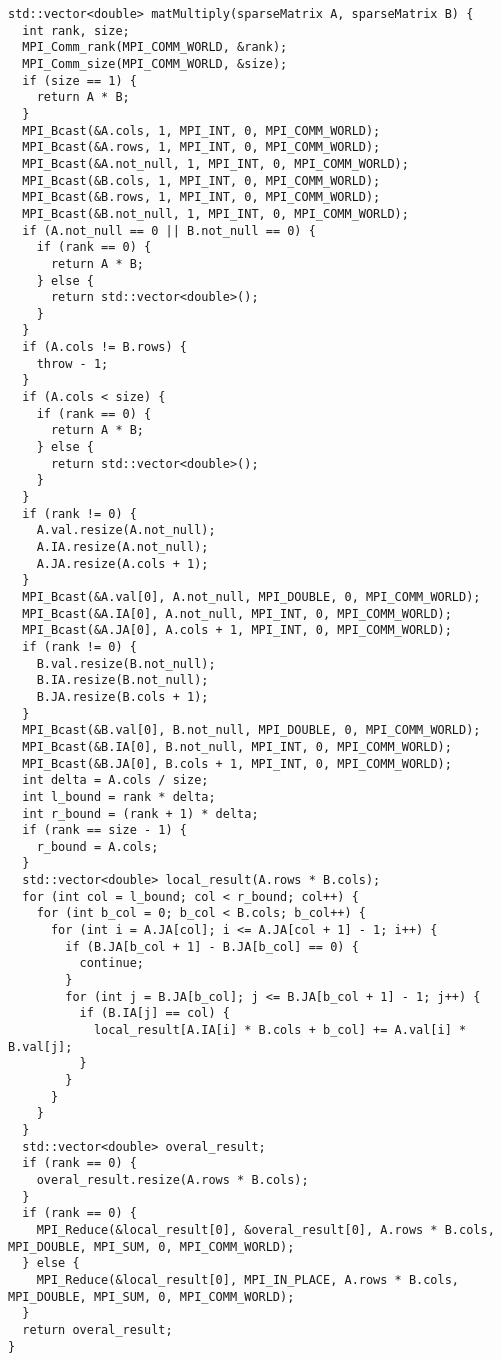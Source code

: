 \documentclass{report}
\begin{document}
\begin{lstlisting}
std::vector<double> matMultiply(sparseMatrix A, sparseMatrix B) {
  int rank, size;
  MPI_Comm_rank(MPI_COMM_WORLD, &rank);
  MPI_Comm_size(MPI_COMM_WORLD, &size);
  if (size == 1) {
    return A * B;
  }
  MPI_Bcast(&A.cols, 1, MPI_INT, 0, MPI_COMM_WORLD);
  MPI_Bcast(&A.rows, 1, MPI_INT, 0, MPI_COMM_WORLD);
  MPI_Bcast(&A.not_null, 1, MPI_INT, 0, MPI_COMM_WORLD);
  MPI_Bcast(&B.cols, 1, MPI_INT, 0, MPI_COMM_WORLD);
  MPI_Bcast(&B.rows, 1, MPI_INT, 0, MPI_COMM_WORLD);
  MPI_Bcast(&B.not_null, 1, MPI_INT, 0, MPI_COMM_WORLD);
  if (A.not_null == 0 || B.not_null == 0) {
    if (rank == 0) {
      return A * B;
    } else {
      return std::vector<double>();
    }
  }
  if (A.cols != B.rows) {
    throw - 1;
  }
  if (A.cols < size) {
    if (rank == 0) {
      return A * B;
    } else {
      return std::vector<double>();
    }
  }
  if (rank != 0) {
    A.val.resize(A.not_null);
    A.IA.resize(A.not_null);
    A.JA.resize(A.cols + 1);
  }
  MPI_Bcast(&A.val[0], A.not_null, MPI_DOUBLE, 0, MPI_COMM_WORLD);
  MPI_Bcast(&A.IA[0], A.not_null, MPI_INT, 0, MPI_COMM_WORLD);
  MPI_Bcast(&A.JA[0], A.cols + 1, MPI_INT, 0, MPI_COMM_WORLD);
  if (rank != 0) {
    B.val.resize(B.not_null);
    B.IA.resize(B.not_null);
    B.JA.resize(B.cols + 1);
  }
  MPI_Bcast(&B.val[0], B.not_null, MPI_DOUBLE, 0, MPI_COMM_WORLD);
  MPI_Bcast(&B.IA[0], B.not_null, MPI_INT, 0, MPI_COMM_WORLD);
  MPI_Bcast(&B.JA[0], B.cols + 1, MPI_INT, 0, MPI_COMM_WORLD);
  int delta = A.cols / size;
  int l_bound = rank * delta;
  int r_bound = (rank + 1) * delta;
  if (rank == size - 1) {
    r_bound = A.cols;
  }
  std::vector<double> local_result(A.rows * B.cols);
  for (int col = l_bound; col < r_bound; col++) {
    for (int b_col = 0; b_col < B.cols; b_col++) {
      for (int i = A.JA[col]; i <= A.JA[col + 1] - 1; i++) {
        if (B.JA[b_col + 1] - B.JA[b_col] == 0) {
          continue;
        }
        for (int j = B.JA[b_col]; j <= B.JA[b_col + 1] - 1; j++) {
          if (B.IA[j] == col) {
            local_result[A.IA[i] * B.cols + b_col] += A.val[i] * B.val[j];
          }
        }
      }
    }
  }
  std::vector<double> overal_result;
  if (rank == 0) {
    overal_result.resize(A.rows * B.cols);
  }
  if (rank == 0) {
    MPI_Reduce(&local_result[0], &overal_result[0], A.rows * B.cols, MPI_DOUBLE, MPI_SUM, 0, MPI_COMM_WORLD);
  } else {
    MPI_Reduce(&local_result[0], MPI_IN_PLACE, A.rows * B.cols, MPI_DOUBLE, MPI_SUM, 0, MPI_COMM_WORLD);
  }
  return overal_result;
}

\end{lstlisting}
\end{document}
